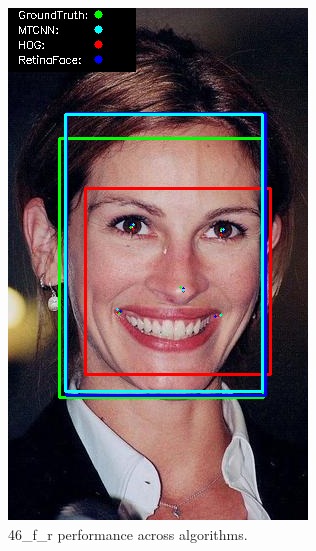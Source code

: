 \documentclass{l4proj}
\begin{document}
\begin{appendices}
\begin{figure}[h!]
  \centering
  \begin{minipage}{0.49\textwidth}
    \centering
     \includegraphics[width=\textwidth]{images/appendix/46.png}
    \caption{46\_f\_r performance across algorithms.}
    \label{whoopi_result}
  \end{minipage}
    \hfill
    \begin{minipage}{0.49\textwidth}
    \centering

\end{minipage}
\end{figure}
\end{appendices}
\end{document}
